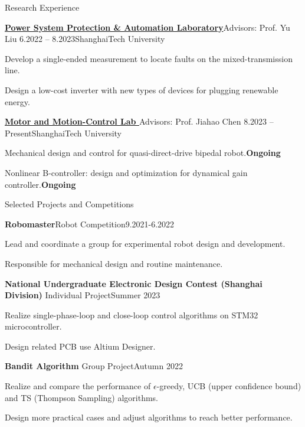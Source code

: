 \documentclass[]{ZhongtaoGuan-CV}
\begin{document}
\begin{section}{Research Experience}
 \begin{subsection}{\textbf{\href{https://pspal.shanghaitech.edu.cn/}{Power System Protection \& Automation Laboratory}}}{Advisors: Prof. Yu Liu}{ 6.2022 -- 8.2023}{ShanghaiTech University}
     \item{Develop a single-ended measurement to locate faults on the mixed-transmission line.}
     \item{Design a low-cost inverter with new types of devices for plugging renewable energy.}
 \end{subsection}
 
 \begin{subsection}{ \textbf{\href{https://faculty.sist.shanghaitech.edu.cn/chenjh/}{Motor and Motion-Control Lab }}}{Advisors: Prof. Jiahao Chen}{ 8.2023 -- Present}{ShanghaiTech University}
     \item{Mechanical design and control for quasi-direct-drive bipedal robot.}\hfill{\textbf{Ongoing}}
     \item{Nonlinear B-controller: design and optimization for dynamical gain controller.}\hfill{\textbf{Ongoing}}
 \end{subsection}
\end{section}


\begin{section}{Selected Projects and Competitions} 
 \begin{subsection}{\textbf{Robomaster}}{Robot Competition}{9.2021-6.2022}{}
     \item{Lead and coordinate a group for experimental robot design and development.}
     \item{Responsible for mechanical design and routine maintenance.}

 \end{subsection}
 \begin{subsection}{\textbf{National Undergraduate Electronic Design Contest (Shanghai Division)}}
     {Individual Project}{Summer 2023}{}
     \item{Realize single-phase-loop and close-loop control algorithms on STM32 microcontroller.}
     \item{Design related PCB use Altium Designer.}
 \end{subsection}
 \begin{subsection}{\textbf{Bandit Algorithm}}
     {Group Project}{Autumn 2022}{}
     \item{Realize and compare the performance of $\epsilon$-greedy, UCB (upper confidence bound) and TS (Thompson Sampling) algorithms.}
     \item{Design more practical cases and adjust algorithms to reach better performance.}
 \end{subsection}
\end{section}
\end{document}
